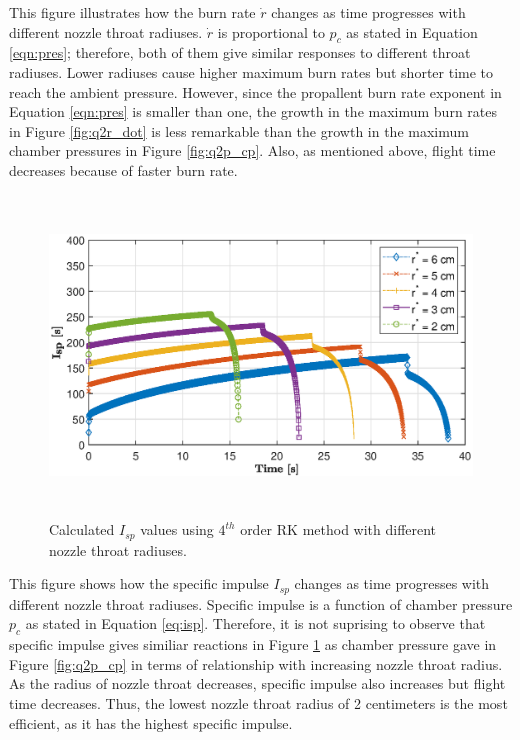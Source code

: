 \documentclass[letterpaper,12pt]{article}
\begin{document}
This figure illustrates how the burn rate $\dot{r}$ changes as time progresses with different nozzle throat radiuses.
$\dot{r}$ is proportional to $p_c$ as stated in Equation \ref{eqn:pres}; therefore, both of them give 
similar responses to different throat radiuses. 
Lower radiuses cause higher maximum burn rates but shorter time to reach the ambient pressure. 
However, since the propallent burn rate exponent in 
Equation \ref{eqn:pres} is smaller than one, the growth in the maximum burn rates in Figure \ref{fig:q2r_dot} is 
less remarkable than the growth in the maximum chamber pressures in Figure \ref{fig:q2p_cp}. Also, as mentioned above,
flight time decreases because of faster burn rate.

\newpage

\begin{figure}[!h]
	\centering
	\includegraphics[height = 8.5cm]{graphs/q2_isp.eps}
	\caption{Calculated $I_{sp}$ values using $4^{th}$ order RK method with different nozzle throat radiuses.}
	\label{fig:q2I_sp}
\end{figure}

This figure shows how the specific impulse $I_{sp}$ changes as time progresses with different nozzle throat radiuses.
Specific impulse is a function of chamber pressure $p_c$ as stated in Equation \ref{eq:isp}. 
Therefore, it is not suprising to observe that specific impulse gives similiar reactions in Figure \ref{fig:q2I_sp} 
as chamber pressure gave in Figure \ref{fig:q2p_cp} in terms of relationship with increasing nozzle throat radius. 
As the radius of nozzle throat decreases, specific impulse also increases but flight time decreases. Thus, the 
lowest nozzle throat radius of 2 centimeters is the most efficient, as it has the highest specific impulse.
\end{document}
